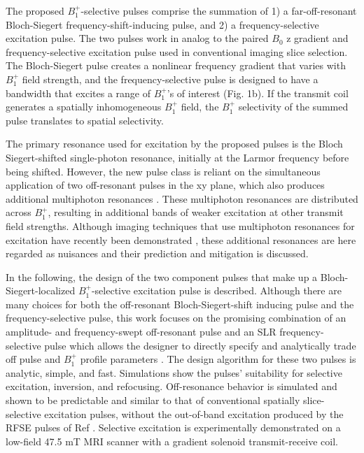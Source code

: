 \documentclass{article}
\begin{document}
\par The proposed $B_1^+$-selective pulses comprise the summation of 1) a far-off-resonant Bloch-Siegert frequency-shift-inducing pulse, 
and 2) a frequency-selective excitation pulse. 
The two pulses work in analog to the paired $B_0$ z gradient and frequency-selective excitation pulse used in conventional imaging slice selection. 
The Bloch-Siegert pulse creates a nonlinear frequency gradient that varies with $B_1^+$ field strength, 
and the frequency-selective pulse is designed to have a bandwidth that excites a range of $B_1^+$'s of interest (Fig. 1b). 
If the transmit coil generates a spatially inhomogeneous $B_1^+$ field,
the $B_1^+$ selectivity of the summed pulse translates to spatial selectivity. 

\par The primary resonance used for excitation by the proposed pulses is the Bloch Siegert-shifted single-photon resonance, initially at the Larmor frequency before being shifted. 
However, the new pulse class is reliant on the simultaneous application of two off-resonant pulses in the xy plane, 
which also produces additional multiphoton resonances \cite{Zur1983MultiphotonI=1/2, Krauss1986Four-fieldI=1/2}. 
These multiphoton resonances are distributed across $B_1^+$, 
resulting in additional bands of weaker excitation at other transmit field strengths.
Although imaging techniques that use multiphoton resonances for excitation have recently been demonstrated \cite{Han2020MultiphotonImplementation}, 
these additional resonances are here regarded as nuisances and their prediction and mitigation is discussed.

\par In the following, the design of the two component pulses that make up a Bloch-Siegert-localized $B_1^+$-selective excitation pulse is described. 
Although there are many choices for both the off-resonant Bloch-Siegert-shift inducing pulse and the frequency-selective pulse, 
this work focuses on the promising combination of an amplitude- and frequency-swept off-resonant pulse 
and an SLR frequency-selective pulse which allows the designer to directly specify and 
analytically trade off pulse and $B_1^+$ profile parameters \cite{Pauly1991ParameterAlgorithm}. 
The design algorithm for these two pulses is analytic, simple, and fast. 
Simulations show the pulses' suitability for selective excitation, inversion, and refocusing. 
Off-resonance behavior is simulated and shown to be predictable and similar to that of conventional spatially slice-selective excitation pulses, 
without the out-of-band excitation produced by the RFSE pulses of Ref \cite{Grissom2014B1+-selectiveAlgorithm}. 
Selective excitation is experimentally demonstrated on a low-field 47.5 mT MRI scanner 
with a gradient solenoid transmit-receive coil.
\end{document}
